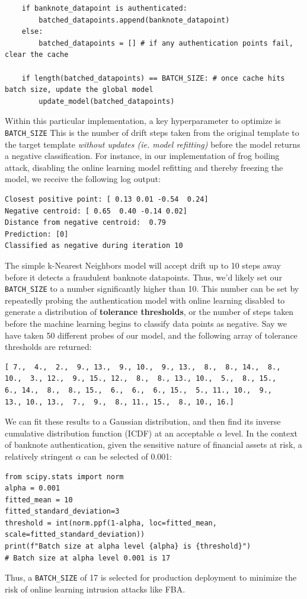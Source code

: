 \documentclass{article}
\begin{document}
\begin{itemize}
\begin{lstlisting}
	if banknote_datapoint is authenticated:
		batched_datapoints.append(banknote_datapoint)
	else:
		batched_datapoints = [] # if any authentication points fail, clear the cache
		
	if length(batched_datapoints) == BATCH_SIZE: # once cache hits batch size, update the global model
		update_model(batched_datapoints)
\end{lstlisting}
Within this particular implementation, a key hyperparameter to optimize is \lstinline!BATCH_SIZE! This is the number of drift steps taken from the original template to the target template \textit{without updates (ie. model refitting)} before the model returns a negative classification. For instance, in our implementation of frog boiling attack, disabling the online learning model refitting and thereby freezing the model, we receive the following log output:
\begin{verbatim}
Closest positive point: [ 0.13 0.01 -0.54  0.24]
Negative centroid: [ 0.65  0.40 -0.14 0.02]
Distance from negative centroid:  0.79
Prediction: [0]
Classified as negative during iteration 10
\end{verbatim}
The simple k-Nearest Neighbors model will accept drift up to 10 steps away before it detects a fraudulent banknote datapoints. Thus, we'd likely set our \lstinline!BATCH_SIZE! to a number significantly higher than 10. This number can be set by repeatedly probing the authentication model with online learning disabled to generate a distribution of \textbf{tolerance thresholds}, or the number of steps taken before the machine learning begins to classify data points as negative. Say we have taken 50 different probes of our model, and the following array of tolerance thresholds are returned:

\begin{verbatim}
[ 7.,  4.,  2.,  9., 13.,  9., 10.,  9., 13.,  8.,  8., 14.,  8.,
10.,  3., 12.,  9., 15., 12.,  8.,  8., 13., 10.,  5.,  8., 15.,
6., 14.,  8.,  8., 15.,  6.,  6.,  6., 15.,  5., 11., 10.,  9.,
13., 10., 13.,  7.,  9.,  8., 11., 15.,  8., 10., 16.]
\end{verbatim}

We can fit these results to a Gaussian distribution, and then find its inverse cumulative distribution function (ICDF) at an acceptable $\alpha$ level. In the context of banknote authentication, given the sensitive nature of financial assets at risk, a relatively stringent $\alpha$ can be selected of 0.001:
\begin{lstlisting}
from scipy.stats import norm
alpha = 0.001
fitted_mean = 10
fitted_standard_deviation=3
threshold = int(norm.ppf(1-alpha, loc=fitted_mean, scale=fitted_standard_deviation))
print(f"Batch size at alpha level {alpha} is {threshold}")
# Batch size at alpha level 0.001 is 17
\end{lstlisting}

Thus, a \lstinline!BATCH_SIZE! of 17 is selected for production deployment to minimize the risk of online learning intrusion attacks like FBA.

 \end{itemize}
\end{document}
